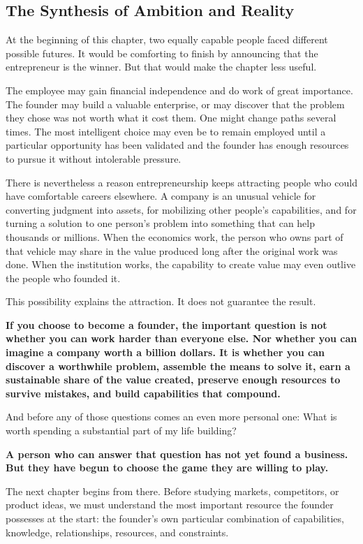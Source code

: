 \subsection{The Synthesis of Ambition and Reality}

At the beginning of this chapter, two equally capable people faced different possible futures. It would be comforting to finish by announcing that the entrepreneur is the winner. But that would make the chapter less useful.

The employee may gain financial independence and do work of great importance. The founder may build a valuable enterprise, or may discover that the problem they chose was not worth what it cost them. One might change paths several times. The most intelligent choice may even be to remain employed until a particular opportunity has been validated and the founder has enough resources to pursue it without intolerable pressure.

There is nevertheless a reason entrepreneurship keeps attracting people who could have comfortable careers elsewhere. A company is an unusual vehicle for converting judgment into assets, for mobilizing other people's capabilities, and for turning a solution to one person's problem into something that can help thousands or millions. When the economics work, the person who owns part of that vehicle may share in the value produced long after the original work was done. When the institution works, the capability to create value may even outlive the people who founded it.

This possibility explains the attraction. It does not guarantee the result.

\textbf{If you choose to become a founder, the important question is not whether you can work harder than everyone else. Nor whether you can imagine a company worth a billion dollars. It is whether you can discover a worthwhile problem, assemble the means to solve it, earn a sustainable share of the value created, preserve enough resources to survive mistakes, and build capabilities that compound.}

And before any of those questions comes an even more personal one: What is worth spending a substantial part of my life building?

\textbf{A person who can answer that question has not yet found a business. But they have begun to choose the game they are willing to play.}

The next chapter begins from there. Before studying markets, competitors, or product ideas, we must understand the most important resource the founder possesses at the start: the founder's own particular combination of capabilities, knowledge, relationships, resources, and constraints.
